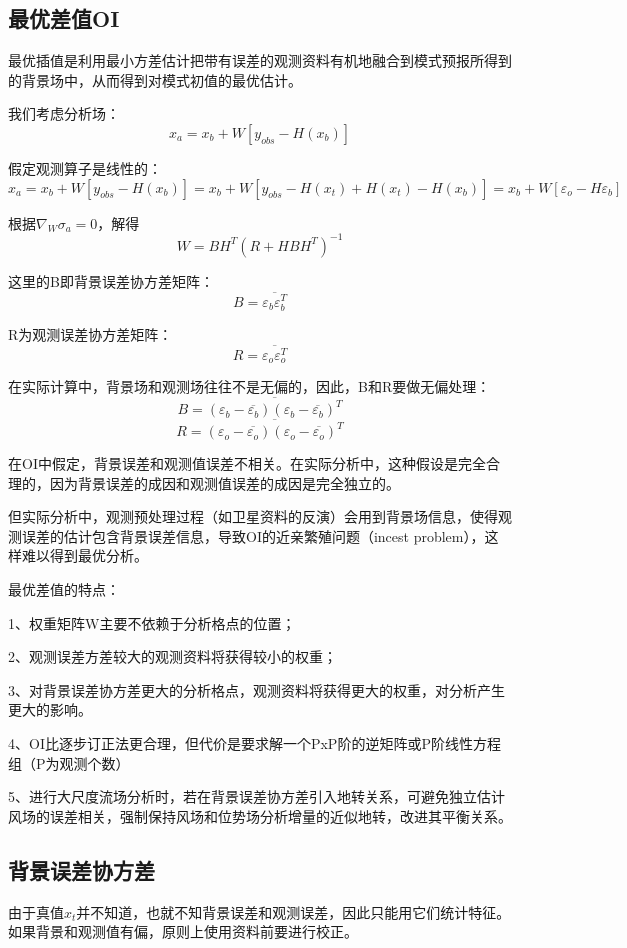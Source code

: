 \documentclass{article}
\begin{document}
\subsection{最优差值OI}
最优插值是利用最小方差估计把带有误差的观测资料有机地融合到模式预报所得到的背景场中，从而得到对模式初值的最优估计。

我们考虑分析场：
$$x_a = x_b + W[y_{obs} - H(x_b)]$$

假定观测算子是线性的：
$$x_a = x_b + W[y_{obs} - H(x_b)] =  x_b + W[y_{obs}-H(x_t)+H(x_t)-H(x_b)]=x_b + W[\varepsilon_o-H\varepsilon_b]$$

根据$\nabla_W \sigma_a = 0$，解得
$$W = BH^T(R + HBH^T)^{-1}$$

这里的B即背景误差协方差矩阵：
$$B=\overline{\varepsilon_b\varepsilon_b^T}$$

R为观测误差协方差矩阵：
$$R=\overline{\varepsilon_o\varepsilon_o^T}$$

在实际计算中，背景场和观测场往往不是无偏的，因此，B和R要做无偏处理：
$$B=\overline{(\varepsilon_b-\overline{\varepsilon_b})(\varepsilon_b-\overline{\varepsilon_b})^T}$$
$$R=\overline{(\varepsilon_o-\overline{\varepsilon_o})(\varepsilon_o-\overline{\varepsilon_o})^T}$$

在OI中假定，背景误差和观测值误差不相关。在实际分析中，这种假设是完全合理的，因为背景误差的成因和观测值误差的成因是完全独立的。

但实际分析中，观测预处理过程（如卫星资料的反演）会用到背景场信息，使得观测误差的估计包含背景误差信息，导致OI的近亲繁殖问题（incest problem），这样难以得到最优分析。

最优差值的特点：

1、权重矩阵W主要不依赖于分析格点的位置；

2、观测误差方差较大的观测资料将获得较小的权重；

3、对背景误差协方差更大的分析格点，观测资料将获得更大的权重，对分析产生更大的影响。  

4、OI比逐步订正法更合理，但代价是要求解一个PxP阶的逆矩阵或P阶线性方程组（P为观测个数）

5、进行大尺度流场分析时，若在背景误差协方差引入地转关系，可避免独立估计风场的误差相关，强制保持风场和位势场分析增量的近似地转，改进其平衡关系。


\subsection{背景误差协方差}
由于真值$x_t$并不知道，也就不知背景误差和观测误差，因此只能用它们统计特征。如果背景和观测值有偏，原则上使用资料前要进行校正。
\end{document}
